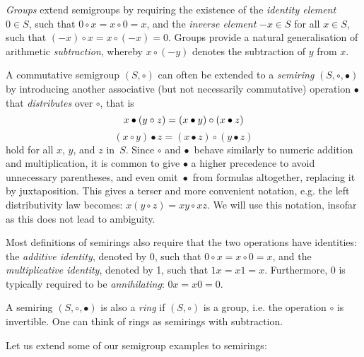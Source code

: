 \emph{Groups} extend semigroups by requiring the existence of the \emph{identity
element} $0 \in S$, such that $0 \circ x = x \circ 0=x$, and the \emph{inverse
element} $-x \in S$ for all $x \in S$, such that
$(-x) \circ x = x \circ (-x) = 0$. Groups provide a natural generalisation of
arithmetic \emph{subtraction}, whereby $x \circ (-y)$ denotes the subtraction of
$y$ from $x$.

A commutative semigroup $(S, \circ)$ can often be extended to a \emph{semiring}
$(S, \circ, \bullet)$ by introducing another associative (but not necessarily
commutative) operation $\bullet$ that \emph{distributes} over $\circ$, that is
\[
x \bullet (y \circ z) = (x \bullet y) \circ (x \bullet z)\\
\]
\[
(x \circ y) \bullet z = (x \bullet z) \circ (y \bullet z)
\]
hold for all $x$, $y$, and $z$ in~$S$. Since $\circ$ and $\bullet$~behave
similarly to numeric addition and multiplication, it is common to give $\bullet$
a higher precedence to avoid unnecessary parentheses, and even omit~$\bullet$~from
formulas altogether, replacing it by juxtaposition. This gives a terser and
more convenient notation, e.g. the left distributivity law becomes:
$x (y \circ z) = x y \circ x z$. We will use this notation, insofar as this does
not lead to ambiguity.

Most definitions of semirings also require that the two operations have
identities: the \emph{additive identity}, denoted by 0, such that
$0 \circ x = x \circ 0=x$, and the \emph{multiplicative identity}, denoted by 1,
such that $1x=x1=x$. Furthermore, 0 is typically required to be
\emph{annihilating}: $0x=x0=0$.

A semiring $(S, \circ, \bullet)$ is also a \emph{ring} if $(S, \circ)$ is a
group, i.e. the operation $\circ$ is invertible. One can think of rings as
semirings with subtraction.

Let us extend some of our semigroup examples to semirings:

